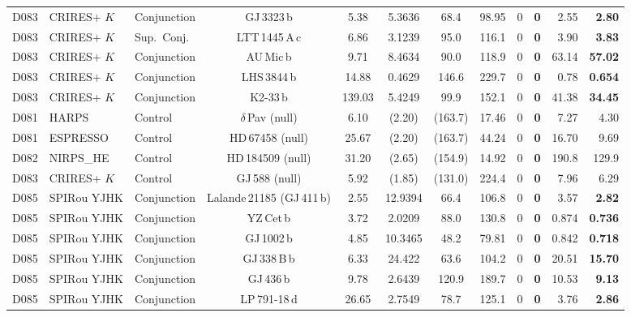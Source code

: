 \documentclass[twocolumn,10pt]{article}
\begin{document}
\begin{table}[!t]
{\begin{tabular}{lllcccccccrr}
D083 & CRIRES+ $K$ & Conjunction & GJ\,3323\,b         & 5.38   & 5.3636 & 68.4  & 98.95 & 0 & \textbf{0} & 2.55   & \textbf{2.80} \\
D083 & CRIRES+ $K$ & Sup.\ Conj. & LTT\,1445\,A\,c     & 6.86   & 3.1239 & 95.0  & 116.1 & 0 & \textbf{0} & 3.90   & \textbf{3.83} \\
D083 & CRIRES+ $K$ & Conjunction & AU\,Mic\,b          & 9.71   & 8.4634 & 90.0  & 118.9 & 0 & \textbf{0} & 63.14  & \textbf{57.02} \\
D083 & CRIRES+ $K$ & Conjunction & LHS\,3844\,b        & 14.88  & 0.4629 & 146.6 & 229.7 & 0 & \textbf{0} & 0.78   & \textbf{0.654} \\
D083 & CRIRES+ $K$ & Conjunction & K2-33\,b            & 139.03 & 5.4249 & 99.9  & 152.1 & 0 & \textbf{0} & 41.38  & \textbf{34.45} \\
\midrule
D081 & HARPS       & Control     & $\delta$\,Pav (null) & 6.10  & (2.20) & (163.7) & 17.46 & 0 & \textbf{0} & 7.27   & 4.30 \\
D081 & ESPRESSO    & Control     & HD\,67458 (null)    & 25.67  & (2.20) & (163.7) & 44.24 & 0 & \textbf{0} & 16.70  & 9.69 \\
D082 & NIRPS\_HE   & Control     & HD\,184509 (null)   & 31.20  & (2.65) & (154.9) & 14.92 & 0 & \textbf{0} & 190.8  & 129.9 \\
D083 & CRIRES+ $K$ & Control     & GJ\,588 (null)      & 5.92   & (1.85) & (131.0) & 224.4 & 0 & \textbf{0} & 7.96   & 6.29 \\
\midrule
D085 & SPIRou YJHK & Conjunction & Lalande\,21185 (GJ\,411\,b) & 2.55 & 12.9394 & 66.4 & 106.8 & 0 & \textbf{0} & 3.57  & \textbf{2.82} \\
D085 & SPIRou YJHK & Conjunction & YZ\,Cet\,b          & 3.72   & 2.0209 & 88.0  & 130.8 & 0 & \textbf{0} & 0.874  & \textbf{0.736} \\
D085 & SPIRou YJHK & Conjunction & GJ\,1002\,b         & 4.85   & 10.3465 & 48.2 & 79.81 & 0 & \textbf{0} & 0.842  & \textbf{0.718} \\
D085 & SPIRou YJHK & Conjunction & GJ\,338\,B\,b       & 6.33   & 24.422 & 63.6  & 104.2 & 0 & \textbf{0} & 20.51  & \textbf{15.70} \\
D085 & SPIRou YJHK & Conjunction & GJ\,436\,b          & 9.78   & 2.6439 & 120.9 & 189.7 & 0 & \textbf{0} & 10.53  & \textbf{9.13} \\
D085 & SPIRou YJHK & Conjunction & LP\,791-18\,d       & 26.65  & 2.7549 & 78.7  & 125.1 & 0 & \textbf{0} & 3.76   & \textbf{2.86} \\

\end{tabular}}
\end{table}
\end{document}
